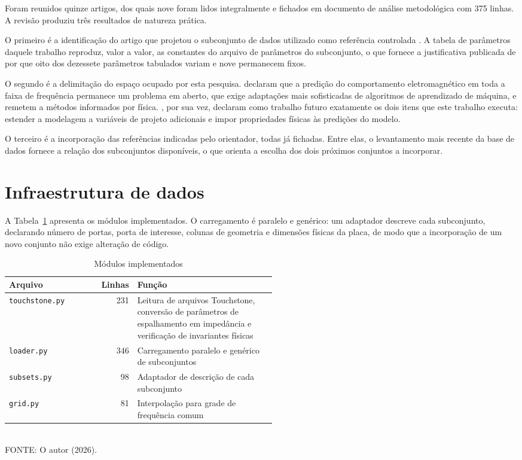 Foram reunidos quinze artigos, dos quais nove foram lidos integralmente e
fichados em documento de análise metodológica com 375 linhas. A revisão produziu
três resultados de natureza prática.

O primeiro é a identificação do artigo que projetou o subconjunto de dados
utilizado como referência controlada \citep{schierholz2023}. A tabela de
parâmetros daquele trabalho reproduz, valor a valor, as constantes do arquivo de
parâmetros do subconjunto, o que fornece a justificativa publicada de por que
oito dos dezessete parâmetros tabulados variam e nove permanecem fixos.

O segundo é a delimitação do espaço ocupado por esta pesquisa.
\citet{hillebrecht2024} declaram que a predição do comportamento
eletromagnético em toda a faixa de frequência permanece um problema em aberto,
que exige adaptações mais sofisticadas de algoritmos de aprendizado de máquina, e
remetem a métodos informados por física. \citet{garbuglia2023}, por sua vez,
declaram como trabalho futuro exatamente os dois itens que este trabalho executa:
estender a modelagem a variáveis de projeto adicionais e impor propriedades
físicas às predições do modelo.

O terceiro é a incorporação das referências indicadas pelo orientador, todas já
fichadas. Entre elas, o levantamento mais recente da base de dados
\citep{hillebrecht2025} fornece a relação dos subconjuntos disponíveis, o que
orienta a escolha dos dois próximos conjuntos a incorporar.

\section{Infraestrutura de dados}
\label{sec:infraestrutura}

A Tabela~\ref{tab:modulos} apresenta os módulos implementados. O carregamento é
paralelo e genérico: um adaptador descreve cada subconjunto, declarando número de
portas, porta de interesse, colunas de geometria e dimensões físicas da placa, de
modo que a incorporação de um novo conjunto não exige alteração de código.

\begin{table}[htb]
\centering
\caption{Módulos implementados}
\label{tab:modulos}
\footnotesize
\begin{tabular}{@{}lrp{0.52\linewidth}@{}}
\toprule
Arquivo & Linhas & Função \\
\midrule
\texttt{touchstone.py} & 231 & Leitura de arquivos Touchstone, conversão de
parâmetros de espalhamento em impedância e verificação de invariantes físicas \\
\texttt{loader.py} & 346 & Carregamento paralelo e genérico de subconjuntos \\
\texttt{subsets.py} & 98 & Adaptador de descrição de cada subconjunto \\
\texttt{grid.py} & 81 & Interpolação para grade de frequência comum \\
\bottomrule
\end{tabular}
\vspace{0.3em}
\\{\footnotesize FONTE: O autor (2026).}
\end{table}

